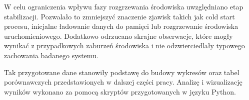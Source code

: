 W celu ograniczenia wpływu fazy rozgrzewania środowiska uwzględniano etap stabilizacji. Pozwalało to zmniejszyć znaczenie zjawisk takich jak cold start procesu, inicjalne ładowanie danych do pamięci lub rozgrzewanie środowiska uruchomieniowego. Dodatkowo odrzucano skrajne obserwacje, które mogły wynikać z przypadkowych zaburzeń środowiska i nie odzwierciedlały typowego zachowania badanego systemu.

Tak przygotowane dane stanowiły podstawę do budowy wykresów oraz tabel porównawczych przedstawionych w dalszej części pracy. Analizę i wizualizację wyników wykonano za pomocą skryptów przygotowanych w języku Python.
